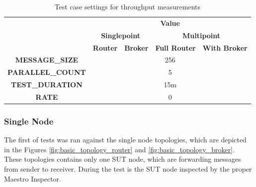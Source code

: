 \begingroup
\setlength{\tabcolsep}{10pt} %
\renewcommand{\arraystretch}{1.35} %
	\begin{table}[H]
	\centering
	\caption{Test case settings for throughput measurements}
	\label{tab:test_case_throughput}
	\begin{tabular}{|c|c|c|c|c|}
	\hline
	\rowcolor[HTML]{C5E3DF}
	\cellcolor[HTML]{C5E3DF}                                         & \multicolumn{4}{c|}{\cellcolor[HTML]{C5E3DF}\textbf{Value}}                                                                          \\ \cline{2-5}
	\rowcolor[HTML]{C5E3DF}
	\cellcolor[HTML]{C5E3DF}                                         & \multicolumn{2}{c|}{\cellcolor[HTML]{C5E3DF}\textbf{Singlepoint}} & \multicolumn{2}{c|}{\cellcolor[HTML]{C5E3DF}\textbf{Multipoint}} \\ \cline{2-5}
	\rowcolor[HTML]{C5E3DF}
	\multirow{-3}{*}{\cellcolor[HTML]{C5E3DF}\textbf{Test Property}} & \textbf{Router}                 & \textbf{Broker}                 & \textbf{Full Router}            & \textbf{With Broker}           \\ \hline
	\textbf{MESSAGE\_SIZE}                                           & \multicolumn{4}{c|}{256}                                                                                                             \\ \hline
	\textbf{PARALLEL\_COUNT}                                         & \multicolumn{4}{c|}{5}                                                                                                               \\ \hline
	\textbf{TEST\_DURATION}                                          & \multicolumn{4}{c|}{15m}                                                                                                             \\ \hline
	\textbf{RATE}                                                    & \multicolumn{4}{c|}{\cellcolor[HTML]{FFFFFF}0}                                                                                       \\ \hline
	\end{tabular}
	\end{table}
\endgroup

\subsubsection*{Single Node}
The first of tests was ran against the single node topologies, which are depicted in the Figures \ref{fig:basic_topology_router} and \ref{fig:basic_topology_broker}. These topologies contains only one SUT node, which are forwarding messages from sender to receiver. During the test is the SUT node inspected by the proper Maestro Inspector.

